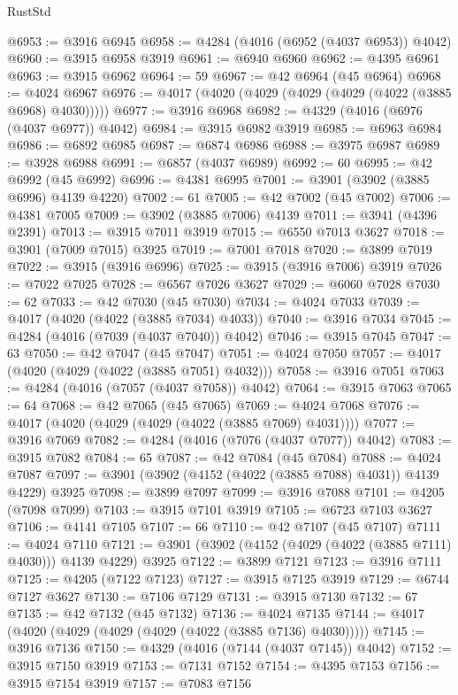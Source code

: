 \begin{lexlean}{RustStd}
\begin{coremodule}
@6953 := @3916 @6945
@6958 := @4284 (@4016 (@6952 (@4037 @6953)) @4042)
@6960 := @3915 @6958 @3919
@6961 := @6940 @6960
@6962 := @4395 @6961
@6963 := @3915 @6962
@6964 := 59
@6967 := @42 @6964 (@45 @6964)
@6968 := @4024 @6967
@6976 := @4017 (@4020 (@4029 (@4029 (@4029 (@4022 (@3885 @6968) @4030)))))
@6977 := @3916 @6968
@6982 := @4329 (@4016 (@6976 (@4037 @6977)) @4042)
@6984 := @3915 @6982 @3919
@6985 := @6963 @6984
@6986 := @6892 @6985
@6987 := @6874 @6986
@6988 := @3975 @6987
@6989 := @3928 @6988
@6991 := @6857 (@4037 @6989)
@6992 := 60
@6995 := @42 @6992 (@45 @6992)
@6996 := @4381 @6995
@7001 := @3901 (@3902 (@3885 @6996) @4139 @4220)
@7002 := 61
@7005 := @42 @7002 (@45 @7002)
@7006 := @4381 @7005
@7009 := @3902 (@3885 @7006) @4139
@7011 := @3941 (@4396 @2391)
@7013 := @3915 @7011 @3919
@7015 := @6550 @7013 @3627
@7018 := @3901 (@7009 @7015) @3925
@7019 := @7001 @7018
@7020 := @3899 @7019
@7022 := @3915 (@3916 @6996)
@7025 := @3915 (@3916 @7006) @3919
@7026 := @7022 @7025
@7028 := @6567 @7026 @3627
@7029 := @6060 @7028
@7030 := 62
@7033 := @42 @7030 (@45 @7030)
@7034 := @4024 @7033
@7039 := @4017 (@4020 (@4022 (@3885 @7034) @4033))
@7040 := @3916 @7034
@7045 := @4284 (@4016 (@7039 (@4037 @7040)) @4042)
@7046 := @3915 @7045
@7047 := 63
@7050 := @42 @7047 (@45 @7047)
@7051 := @4024 @7050
@7057 := @4017 (@4020 (@4029 (@4022 (@3885 @7051) @4032)))
@7058 := @3916 @7051
@7063 := @4284 (@4016 (@7057 (@4037 @7058)) @4042)
@7064 := @3915 @7063
@7065 := 64
@7068 := @42 @7065 (@45 @7065)
@7069 := @4024 @7068
@7076 := @4017 (@4020 (@4029 (@4029 (@4022 (@3885 @7069) @4031))))
@7077 := @3916 @7069
@7082 := @4284 (@4016 (@7076 (@4037 @7077)) @4042)
@7083 := @3915 @7082
@7084 := 65
@7087 := @42 @7084 (@45 @7084)
@7088 := @4024 @7087
@7097 := @3901 (@3902 (@4152 (@4022 (@3885 @7088) @4031)) @4139 @4229) @3925
@7098 := @3899 @7097
@7099 := @3916 @7088
@7101 := @4205 (@7098 @7099)
@7103 := @3915 @7101 @3919
@7105 := @6723 @7103 @3627
@7106 := @4141 @7105
@7107 := 66
@7110 := @42 @7107 (@45 @7107)
@7111 := @4024 @7110
@7121 := @3901 (@3902 (@4152 (@4029 (@4022 (@3885 @7111) @4030))) @4139 @4229) @3925
@7122 := @3899 @7121
@7123 := @3916 @7111
@7125 := @4205 (@7122 @7123)
@7127 := @3915 @7125 @3919
@7129 := @6744 @7127 @3627
@7130 := @7106 @7129
@7131 := @3915 @7130
@7132 := 67
@7135 := @42 @7132 (@45 @7132)
@7136 := @4024 @7135
@7144 := @4017 (@4020 (@4029 (@4029 (@4029 (@4022 (@3885 @7136) @4030)))))
@7145 := @3916 @7136
@7150 := @4329 (@4016 (@7144 (@4037 @7145)) @4042)
@7152 := @3915 @7150 @3919
@7153 := @7131 @7152
@7154 := @4395 @7153
@7156 := @3915 @7154 @3919
@7157 := @7083 @7156

\end{coremodule}
\end{lexlean}
